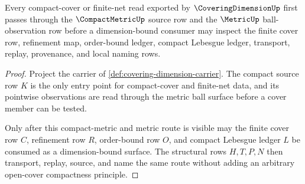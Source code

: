\begin{theorem}
\label{thm:covering-dimension-compact-metric-forward-link}
Every compact-cover or finite-net read exported by $\CoveringDimensionUp$ first passes through the $\CompactMetricUp$ source row and the $\MetricUp$ ball-observation row before a dimension-bound consumer may inspect the finite cover row, refinement map, order-bound ledger, compact Lebesgue ledger, transport, replay, provenance, and local naming rows.
\end{theorem}
\begin{proof}
Project the carrier of \autoref{def:covering-dimension-carrier}. The compact source row $K$ is the only entry point for compact-cover and finite-net data, and its pointwise observations are read through the metric ball surface before a cover member can be tested.

Only after this compact-metric and metric route is visible may the finite cover row $C$, refinement row $R$, order-bound row $O$, and compact Lebesgue ledger $L$ be consumed as a dimension-bound surface. The structural rows $H,T,P,N$ then transport, replay, source, and name the same route without adding an arbitrary open-cover compactness principle.
\end{proof}
